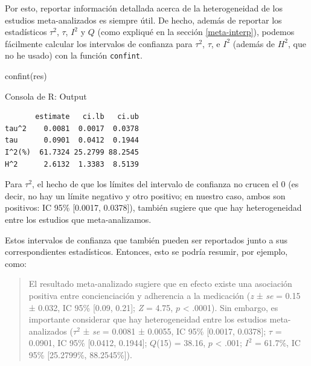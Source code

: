\documentclass[
  bookmarksnumbered]{article}
\newenvironment{Shaded}{\begin{snugshade}}{\end{snugshade}}
\newcommand{\FunctionTok}[1]{\textcolor[rgb]{0.39,0.29,0.61}{#1}}
\newcommand{\NormalTok}[1]{\textcolor[rgb]{0.12,0.11,0.11}{#1}}
\begin{document}
Por esto, reportar información detallada acerca de la heterogeneidad de los estudios meta-analizados es siempre útil. De hecho, además de reportar los estadísticos \(\tau^2\), \(\tau\), \(I^2\) y \(Q\) (como expliqué en la sección \ref{meta-interp}), podemos fácilmente calcular los intervalos de confianza para \(\tau^2\), \(\tau\), e \(I^2\) (además de \(H^2\), que no he usado) con la función \texttt{confint}.

\begin{Shaded}
\begin{Highlighting}[]
\FunctionTok{confint}\NormalTok{(res)}
\end{Highlighting}
\end{Shaded}

\begin{ROut}{Consola de R: Output~\thetcbcounter}
                \begin{footnotesize}
                \begin{verbatim} 
       estimate   ci.lb   ci.ub 
tau^2    0.0081  0.0017  0.0378 
tau      0.0901  0.0412  0.1944 
I^2(%)  61.7324 25.2799 88.2545 
H^2      2.6132  1.3383  8.5139 
 \end{verbatim}
                \end{footnotesize}
                \end{ROut}

Para \(\tau^2\), el hecho de que los límites del intervalo de confianza no crucen el 0 (es decir, no hay un límite negativo y otro positivo; en nuestro caso, ambos son positivos: IC 95\% {[}0.0017, 0.0378{]}), también sugiere que que hay heterogeneidad entre los estudios que meta-analizamos.

Estos intervalos de confianza que también pueden ser reportados junto a sus correspondientes estadísticos. Entonces, esto se podría resumir, por ejemplo, como:

\begin{quote}
El resultado meta-analizado sugiere que en efecto existe una asociación positiva entre concienciación y adherencia a la medicación (\emph{z} ± \emph{se} = 0.15 ± 0.032, IC 95\% {[}0.09, 0.21{]}; \emph{Z} = 4.75, \(p\) \textless{} .0001). Sin embargo, es importante considerar que hay heterogeneidad entre los estudios meta-analizados (\(\tau^2\) ± \emph{se} = 0.0081 ± 0.0055, IC 95\% {[}0.0017, 0.0378{]}; \(\tau\) = 0.0901, IC 95\% {[}0.0412, 0.1944{]}; \(Q\)(15) = 38.16, \(p\) \textless{} .001; \(I^2\) = 61.7\%, IC 95\% {[}25.2799\%, 88.2545\%{]}).
\end{quote}
\end{document}
